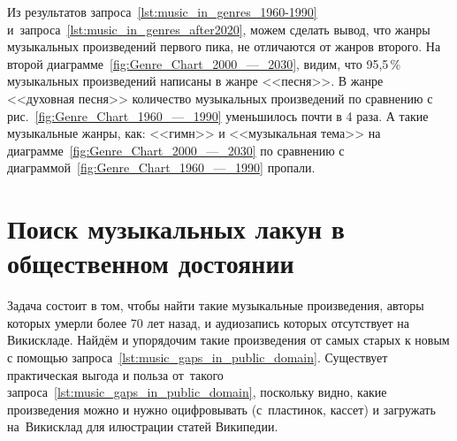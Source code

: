 Из результатов запроса~\ref{lst:music_in_genres_1960-1990} 
и~запроса~\ref{lst:music_in_genres_after2020}, можем сделать вывод, 
что жанры музыкальных произведений первого пика, не отличаются от жанров второго. 
На второй диаграмме~\ref{fig:Genre_Chart_2000_—_2030}, видим, что 95,5\,\% музыкальных произведений написаны в жанре <<песня>>. В жанре <<духовная песня>> количество музыкальных произведений по сравнению с рис.~\ref{fig:Genre_Chart_1960_—_1990} уменьшилось почти в 4 раза. А такие музыкальные жанры, как: <<гимн>> и <<музыкальная тема>> на диаграмме~\ref{fig:Genre_Chart_2000_—_2030} по сравнению с диаграммой~\ref{fig:Genre_Chart_1960_—_1990} пропали.





\newpage
\section{Поиск музыкальных лакун в общественном достоянии}

Задача состоит в том, чтобы найти такие музыкальные произведения, 
авторы которых умерли более 70 лет назад, 
и аудиозапись которых отсутствует на Викискладе. 
Найдём и упорядочим такие произведения от самых старых к новым 
с помощью запроса~\ref{lst:music_gaps_in_public_domain}. 
Существует практическая выгода и польза от~такого запроса~\ref{lst:music_gaps_in_public_domain}, 
поскольку видно, какие произведения можно и нужно оцифровывать 
(с~пластинок, кассет) и загружать на~Викисклад для илюстрации статей Википедии.

